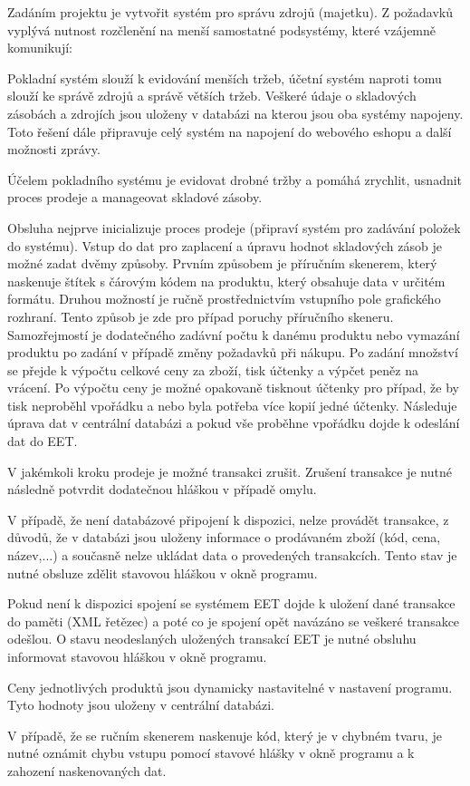 
Zadáním projektu je vytvořit systém pro správu zdrojů (majetku). Z požadavků vyplývá nutnost rozčlenění na menší samostatné podsystémy, které vzájemně komunikují:

\vskip 4mm
\vskip 4mm 

Pokladní systém slouží k evidování menších tržeb, účetní systém naproti tomu slouží ke správě zdrojů a správě větších tržeb. Veškeré údaje o skladových zásobách a zdrojích jsou uloženy v databázi na kterou jsou oba systémy napojeny. Toto řešení dále připravuje celý systém na napojení do webového eshopu a další možnosti zprávy.

Účelem pokladního systému je evidovat drobné tržby a pomáhá zrychlit, usnadnit proces prodeje a manageovat skladové zásoby.

Obsluha nejprve inicializuje proces prodeje (připraví systém pro zadávání položek do systému). Vstup do dat pro zaplacení a úpravu hodnot skladových zásob je možné zadat dvěmy způsoby. Prvním způsobem je příručním skenerem, který naskenuje štítek s čárovým kódem na produktu, který obsahuje data v určitém formátu. Druhou možností je ručně prostřednictvím vstupního pole grafického rozhraní. Tento způsob je zde pro případ poruchy příručního skeneru. Samozřejmostí je dodatečného zadávní počtu k danému produktu nebo vymazání produktu po zadání v případě změny požadavků při nákupu. Po zadání množství se přejde k výpočtu celkové ceny za zboží, tisk účtenky a výpčet peněz na vrácení. Po výpočtu ceny je možné opakovaně tisknout účtenky pro případ, že by tisk neproběhl vpořádku a nebo byla potřeba více kopií jedné účtenky. Následuje úprava dat v centrální databázi a pokud vše proběhne vpořádku dojde k odeslání dat do EET.

V jakémkoli kroku prodeje je možné transakci zrušit. Zrušení transakce je nutné následně potvrdit dodatečnou hláškou v případě omylu.

\centerline{}

V případě, že není databázové připojení k dispozici, nelze provádět transakce, z důvodů, že v databázi jsou uloženy informace o prodávaném zboží (kód, cena, název,...) a současně nelze ukládat data o provedených transakcích. Tento stav je nutné obsluze zdělit stavovou hláškou v okně programu.

Pokud není k dispozici spojení se systémem EET dojde k uložení dané transakce do paměti (XML řetězec) a poté co je spojení opět navázáno se veškeré transakce odešlou. O stavu neodeslaných uložených transakcí EET je nutné obsluhu informovat stavovou hláškou v okně programu.

Ceny jednotlivých produktů jsou dynamicky nastavitelné v nastavení programu. Tyto hodnoty jsou uloženy v centrální databázi.

V případě, že se ručním skenerem naskenuje kód, který je v chybném tvaru, je nutné oznámit chybu vstupu pomocí stavové hlášky v okně programu a k zahození naskenovaných dat. 







